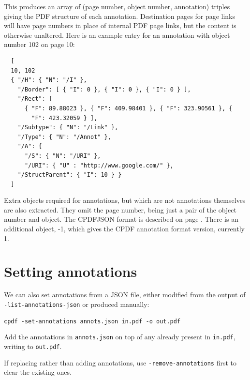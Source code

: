 \documentclass{book}
\begin{document}
\noindent This produces an array of (page number, object number, annotation) triples giving the PDF structure of each annotation. Destination pages for page links will have page numbers in place of internal PDF page links, but the content is otherwise unaltered. Here is an example entry for an annotation with object number 102 on page 10:

{\small\begin{verbatim}
  [
  10, 102
  { "/H": { "N": "/I" },
    "/Border": [ { "I": 0 }, { "I": 0 }, { "I": 0 } ],
    "/Rect": [
      { "F": 89.88023 }, { "F": 409.98401 }, { "F": 323.90561 }, {
        "F": 423.32059 } ],
    "/Subtype": { "N": "/Link" },
    "/Type": { "N": "/Annot" },
    "/A": {
      "/S": { "N": "/URI" },
      "/URI": { "U" : "http://www.google.com/" },
    "/StructParent": { "I": 10 } }
  ]
\end{verbatim}}

\noindent Extra objects required for annotations, but which are not annotations themselves are also extracted. They omit the page number, being just a pair of the object number and object. The CPDFJSON format is described on page \pageref{cpdfjson}. There is an additional object, -1, which gives the CPDF annotation format version, currently 1.

\section{Setting annotations}

We can also set annotations from a JSON file, either modified from the output of \texttt{-list-annotations-json} or produced manually:

  \begin{framed}
    \noindent\small\verb!cpdf -set-annotations annots.json in.pdf -o out.pdf !
    
    \vspace{2.5mm}
    \noindent Add the annotations in \texttt{annots.json} on top of any already present in \texttt{in.pdf}, writing to \texttt{out.pdf}.

  \end{framed}

\noindent If replacing rather than adding annotations, use \texttt{-remove-annotations} first to clear the existing ones.
\end{document}
